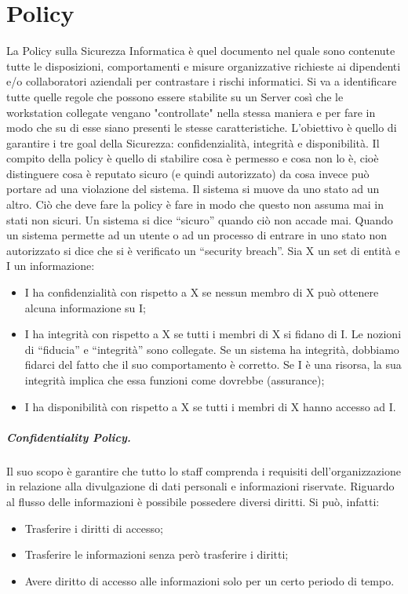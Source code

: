 
\chapter {Policy}

La Policy sulla Sicurezza Informatica è quel documento nel quale sono
contenute tutte le
disposizioni, comportamenti e misure organizzative richieste ai dipendenti
e/o collaboratori
aziendali per contrastare i rischi informatici. Si va a identificare tutte
quelle regole che possono
essere stabilite su un Server così che le workstation collegate vengano
"controllate" nella stessa
maniera e per fare in modo che su di esse siano presenti le stesse
caratteristiche.
L'obiettivo è quello di garantire i tre goal della Sicurezza:
confidenzialità, integrità e disponibilità.
Il compito della policy è quello di stabilire cosa è permesso e cosa non
lo è, cioè distinguere cosa è
reputato sicuro (e quindi autorizzato) da cosa invece può portare ad una
violazione del sistema. Il
sistema si muove da uno stato ad un altro. Ciò che deve fare la policy è
fare in modo che questo
non assuma mai in stati non sicuri. Un sistema si dice “sicuro” quando ciò
non accade mai.
Quando un sistema permette ad un utente o ad un processo di entrare in uno
stato non autorizzato
si dice che si è verificato un “security breach”.
Sia X un set di entità e I un informazione:
\begin{itemize}
      \item I ha confidenzialità con rispetto a X se nessun membro di X può
            ottenere alcuna
            informazione su I;
      \item I ha integrità con rispetto a X se tutti i membri di X si fidano
            di I. Le nozioni di “fiducia” e
            “integrità” sono collegate. Se un sistema ha integrità, dobbiamo
            fidarci del fatto che il suo
            comportamento è corretto. Se I è una risorsa, la sua integrità implica
            che essa funzioni
            come dovrebbe (assurance);
      \item I ha disponibilità con rispetto a X se tutti i membri di X hanno
            accesso ad I.
\end{itemize}


\paragraph{Confidentiality Policy.}

Il suo scopo è garantire che tutto lo staff comprenda i requisiti
dell'organizzazione in relazione alla
divulgazione di dati personali e informazioni riservate.
Riguardo al flusso delle informazioni è possibile possedere diversi
diritti. Si può, infatti:
\begin{itemize}
      \item Trasferire i diritti di accesso;
      \item Trasferire le informazioni senza però trasferire i diritti;
      \item Avere diritto di accesso alle informazioni solo per un certo
            periodo di tempo.
\end{itemize}

